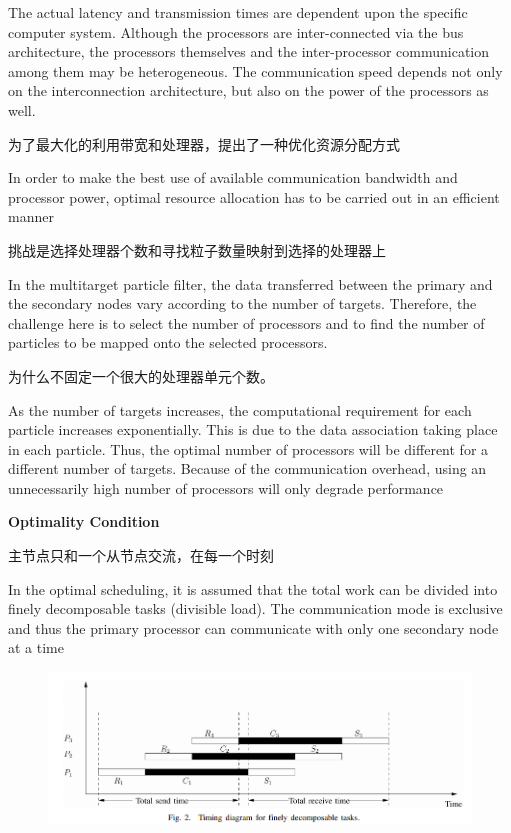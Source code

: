 \documentclass[a4paper, 11pt]{article}
\begin{document}
\begin{CJK}{UTF8}{gbsn}
The actual latency
and transmission times are dependent upon the
specific computer system. Although the processors
are inter-connected via the bus architecture, the
processors themselves and the inter-processor
communication among them may be heterogeneous.
The communication speed depends not only on the
interconnection architecture, but also on the power
of the processors as well.

为了最大化的利用带宽和处理器，提出了一种优化资源分配方式


In order to make the best use of available
communication bandwidth and processor power,
optimal resource allocation has to be carried out
in an efficient manner

挑战是选择处理器个数和寻找粒子数量映射到选择的处理器上


 In the multitarget particle
filter, the data transferred between the primary
and the secondary nodes vary according to the
number of targets. Therefore, the challenge here is
to select the number of processors and to find the
number of particles to be mapped onto the selected
processors.

为什么不固定一个很大的处理器单元个数。

As the number of targets increases,
the computational requirement for each particle
increases exponentially. This is due to the data
association taking place in each particle. Thus,
the optimal number of processors will be different
for a different number of targets. Because of the
communication overhead, using an unnecessarily
high number of processors will only degrade
performance

\textbf{Optimality Condition
}

主节点只和一个从节点交流，在每一个时刻


In the optimal scheduling, it is assumed that the
total work can be divided into finely decomposable
tasks (divisible load).
The communication mode
is exclusive and thus the primary processor can
communicate with only one secondary node at a
time
\begin{figure}[htp]
\centering
\includegraphics[scale=0.5]{timeing diagram.png}
\caption{}
\label{}
\end{figure}


\end{CJK}
\end{document}
